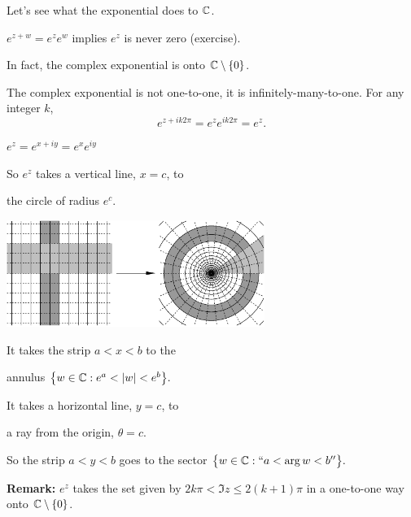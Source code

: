 \documentclass[10pt,aspectratio=169]{beamer}
\begin{document}
\begin{frame}
Let's see what the exponential does to ${\mathbb{C}}$.

\medskip
\pause

$e^{z+w} = e^z e^w$ implies $e^z$ is never zero (exercise).

\medskip
\pause

In fact, the complex exponential is onto ${\mathbb{C}} \setminus \{ 0 \}$.

\medskip
\pause

The complex exponential is not one-to-one, it is 
infinitely-many-to-one.  For any integer $k$,
\[
e^{z+ik2\pi} = 
e^{z} e^{ik2\pi} =
e^z .
\]

\end{frame}

\begin{frame}
$
e^{z} = 
e^{x+iy} =
e^x e^{iy}  %
$

\medskip
\pause
So $e^z$ takes a vertical line, $x=c$, to 

the circle of radius $e^c$.

\vspace*{-0.5in}
\hspace*{2.35in}
\includegraphics[width=3.3in]{../figures/expplotlines}

\vspace*{-0.8in}


\pause

It takes the strip $a < x < b$ to the

annulus
$
\bigl\{ w \in {\mathbb{C}} : e^a < \lvert {w} \rvert < e^b \bigr\} .
$

\medskip
\pause

It takes a horizontal line, $y=c$, to

a ray from the origin, $\theta=c$.

\pause
\medskip

So the strip $a < y < b$ goes to the sector
$
\bigl\{ w \in {\mathbb{C}} : ``a < \arg w < b'' \bigr\} .
$

\medskip
\pause

\textbf{Remark:}
$e^z$ takes the set given by
$2k\pi < \Im z \leq 2(k+1)\pi$ in a one-to-one way onto
${\mathbb{C}} \setminus \{ 0 \}$.


\end{frame}
\end{document}
